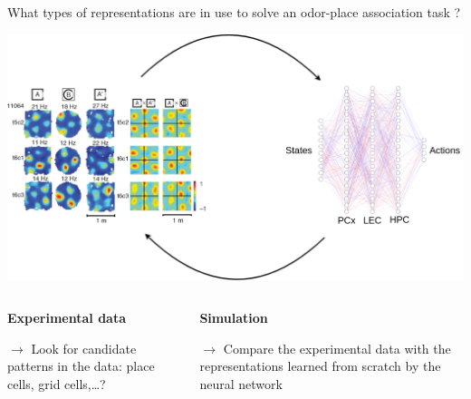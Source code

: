 \documentclass[bigger]{beamer}
\begin{document}
\begin{frame}[label={sec:orgb6c045b}]{What types of representations are in use to solve an odor-place association task ?}
\begin{center}
\includegraphics[height=0.4\textheight]{img/exp-vs-simu.drawio.png}
\end{center}
\vspace{-3em}
\begin{columns}
\begin{column}[t]{0.5\columnwidth}
\begin{center}
\textbf{Experimental data}
\end{center}
\(\to\) Look for candidate patterns in the data: place cells, grid cells,\dots{}?
\end{column}
\begin{column}[t]{0.5\columnwidth}
\begin{center}
\textbf{Simulation}
\end{center}
\(\to\) Compare the experimental data with the representations learned from scratch by the neural network

\end{column}
\end{columns}
\end{frame}
\end{document}

